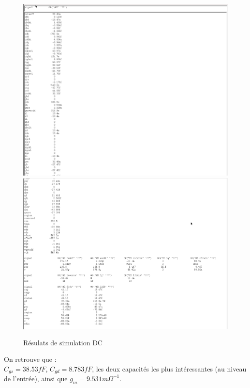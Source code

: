 \documentclass[a4paper]{article}
\begin{document}
\clearpage

\begin{figure}[!htb]
\begin{center}
  \includegraphics[scale=0.46]{Transistor-DC-1.png}
  \includegraphics[scale=0.40]{Transistor-DC-2.png}
  \caption{R\'esulats de simulation DC}
\end{center}
\end{figure}

On retrouve que :\\
 $C_{gs} = 38.53 fF$, $C_{gd} = 8.783 fF$, les deux capacit\'es les plus int\'eressantes (au niveau
de l'entr\'ee), ainsi que $g_m = 9.531 m \Omega^{-1}$.
\end{document}
